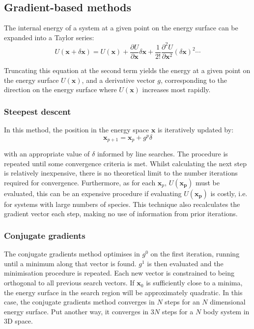 \subsection{Gradient-based methods}

The internal energy of a system at a given point on the energy surface can be expanded into a Taylor series:
\begin{equation}
\label{eq:taylor}
  U(\mathbf{x}+\delta \mathbf{x}) = U(\mathbf{x}) + \frac{\partial U}{\partial \mathbf{x}} \delta \mathbf{x} + \frac{1}{2!} \frac{\partial ^2 U}{\partial \mathbf{x}^2}(\delta \mathbf{x})^2 \cdots
\end{equation}

Truncating this equation at the second term yields the energy at a given point on the energy surface $U(\mathbf{x})$, and a derivative vector $g$, corresponding to the direction on the energy surface where $U(\mathbf{x})$ increases most rapidly.

\subsubsection{Steepest descent}
In this method, the position in the energy space $\mathbf{x}$ is iteratively updated by:
\begin{equation}
\mathbf{x}_{p+1} = \mathbf{x}_p + g^p\delta
\end{equation}

with an appropriate value of $\delta$ informed by line searches.
The procedure is repeated until some convergence criteria is met.
Whilst calculating the next step is relatively inexpensive, there is no theoretical limit to the number iterations required for convergence.
Furthermore, as for each $\mathbf{x}_p$, $U(\mathbf{x_p})$ must be evaluated, this can be an expensive procedure if evaluating $U(\mathbf{x_p})$ is costly, i.e. for systems with large numbers of species.
This technique also recalculates the gradient vector each step, making no use of information from prior iterations.

\subsubsection{Conjugate gradients}
The conjugate gradients method optimises in $g^0$ on the first iteration, running until a minimum along that vector is found.
$g^1$ is then evaluated and the minimisation procedure is repeated. 
Each new vector is constrained to being orthogonal to all previous search vectors.
If $\mathbf{x}_0$ is sufficiently close to a minima, the energy surface in the search region will be approximately quadratic. 
In this case, the conjugate gradients method converges in $N$ steps for an $N$ dimensional energy surface. 
Put another way, it converges in $3N$ steps for a $N$ body system in 3D space.

